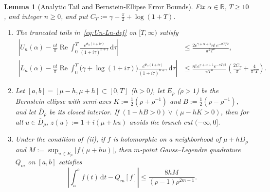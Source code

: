 \documentclass[11pt, reqno]{amsart}
\newtheorem{lemma}{Lemma}[section]
\theoremstyle{remark}
\numberwithin{equation}{section}
\DeclareMathOperator{\re}{Re}
\newcommand{\R}{\mathbb{R}}
\newcommand{\dd}{\,\mathrm{d}}
\begin{document}
\begin{lemma}[Analytic Tail and Bernstein-Ellipse Error Bounds]\label{lem:arb-bounds}
Fix $\alpha \in \R$, $T \ge 10$, and integer $n \ge 0$, and put $C_T := \gamma + \frac{\pi}{2} + \log(1+T)$.
\begin{enumerate}
\item[(i)] The truncated tails in~\eqref{eq:Un-Ln-def} on $[T,\infty)$ satisfy
\begin{align}
\left| U_n(\alpha) - \frac{n!}{\pi}\re \int_0^T \frac{e^{\Phi_\alpha(1+i\tau)}}{(1+i\tau)^{n+1}}\dd\tau \right|
&\le \frac{2 e^{\gamma+\alpha+1} n!\, e^{-\pi T/2}}{\pi^2 T^n}, \label{eq:Un-tail}\\
\left| L_n(\alpha) - \frac{n!}{\pi}\re \int_0^T \bigl(\gamma+\log(1+i\tau)\bigr)
\frac{e^{\Phi_\alpha(1+i\tau)}}{(1+i\tau)^{n+1}}\dd\tau \right|
&\le \frac{n!\, e^{\gamma+\alpha+1} e^{-\pi T/2}}{\pi T^n}\left(\frac{2 C_T}{\pi} + \frac{4}{\pi^2 T}\right). \label{eq:Ln-tail}
\end{align}
\item[(ii)] Let $[a,b] = [\mu - h, \mu + h] \subset [0, T]$ ($h > 0$), let $E_\rho$ ($\rho > 1$) be the
Bernstein ellipse with semi-axes $K := \frac{1}{2}(\rho+\rho^{-1})$ and $B := \frac{1}{2}(\rho-\rho^{-1})$,
and let $\overline{D}_\rho$ be its closed interior. If $(1 - h B > 0) \lor (\mu - h K > 0)$, then for
all $u \in \overline{D}_\rho$, $z(u) := 1 + i(\mu + h u)$ avoids the branch cut $(-\infty, 0]$.
\item[(iii)] Under the condition of~(ii), if $f$ is holomorphic on a neighborhood of $\mu + h\overline{D}_\rho$
and $M := \sup_{u \in E_\rho} |f(\mu + h u)|$, then $m$-point Gauss--Legendre quadrature $Q_m$ on $[a,b]$ satisfies
\begin{equation}\label{eq:GL-bernstein-err}
\left|\int_a^b f(t)\dd t - Q_m[f]\right| \le \frac{8 h M}{(\rho - 1)\rho^{2m-1}}.
\end{equation}
\end{enumerate}
\end{lemma}
\end{document}

